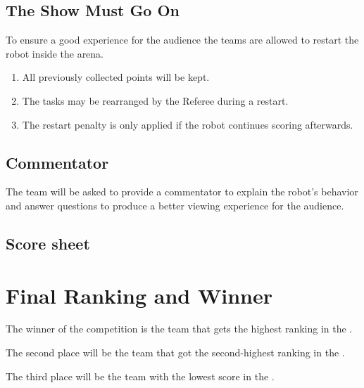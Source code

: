 \subsection{The Show Must Go On}
To ensure a good experience for the audience the teams are allowed to restart the robot inside the arena.
\begin{enumerate}[nosep]
  \item All previously collected points will be kept.
  \item The tasks may be rearranged by the Referee during a restart.
  \item The restart penalty is only applied if the robot continues scoring afterwards.
\end{enumerate}

\subsection{Commentator}
The team will be asked to provide a commentator to explain the robot's behavior and answer questions to produce a better viewing experience for the audience.


\subsection*{Score sheet}


\section{Final Ranking and Winner}

The winner of the competition is the team that gets the highest ranking in the .

The second place will be the team that got the second-highest ranking in the .

The third place will be the team with the lowest score in the .


